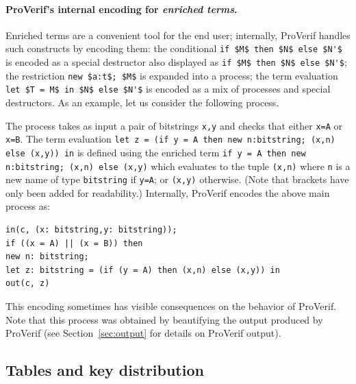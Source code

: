 \documentclass{book}
\begin{document}
\paragraph{ProVerif's internal encoding for \emph{enriched terms}.} Enriched terms are a convenient tool for the end user; internally, ProVerif handles such constructs by encoding them: the conditional \lstinline!if $M$ then $N$ else $N'$! is encoded as a special destructor also displayed as \lstinline!if $M$ then $N$ else $N'$!; the restriction \lstinline!new $a:t$; $M$! is expanded into a process; the term evaluation \lstinline!let $T = M$ in $N$ else $N'$! is encoded as a mix of processes and special destructors. As an example, let us consider the following process.
%

%
The process takes as input a pair of bitstrings \lstinline!x,y! and checks that either \lstinline!x=A! or \lstinline!x=B!. The term evaluation \lstinline!let z = (if y = A then new n:bitstring; (x,n) else (x,y)) in! is defined using the enriched term \lstinline!if y = A then new n:bitstring; (x,n) else (x,y)! which evaluates to the tuple \lstinline!(x,n)! where  \lstinline!n! is a new name of type \lstinline!bitstring! if \lstinline!y=A!; or \lstinline!(x,y)! otherwise. (Note that brackets have only been added for readability.) Internally, ProVerif encodes the above main process as:
%
\begin{lstlisting}
in(c, (x: bitstring,y: bitstring));
if ((x = A) || (x = B)) then
new n: bitstring;
let z: bitstring = (if (y = A) then (x,n) else (x,y)) in
out(c, z)
\end{lstlisting}
This encoding sometimes has visible consequences on the behavior of ProVerif. Note that this process was obtained by beautifying the output produced by ProVerif (see Section~\ref{sec:output} for details on ProVerif output).


\subsection{Tables and key distribution}\label{sec:tables}
\end{document}
